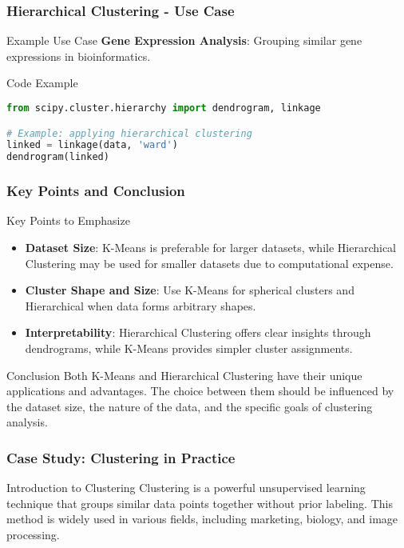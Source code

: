 \documentclass[aspectratio=169]{beamer}
\begin{document}
\begin{frame}[fragile]
    \frametitle{Hierarchical Clustering - Use Case}
    
    \begin{block}{Example Use Case}
        \textbf{Gene Expression Analysis}: Grouping similar gene expressions in bioinformatics.
    \end{block}
    
    \begin{block}{Code Example}
        \begin{lstlisting}[language=Python]
from scipy.cluster.hierarchy import dendrogram, linkage

# Example: applying hierarchical clustering
linked = linkage(data, 'ward')
dendrogram(linked)
        \end{lstlisting}
    \end{block}
\end{frame}

\begin{frame}[fragile]
    \frametitle{Key Points and Conclusion}
    
    \begin{block}{Key Points to Emphasize}
        \begin{itemize}
            \item \textbf{Dataset Size}: K-Means is preferable for larger datasets, while Hierarchical Clustering may be used for smaller datasets due to computational expense.
            \item \textbf{Cluster Shape and Size}: Use K-Means for spherical clusters and Hierarchical when data forms arbitrary shapes.
            \item \textbf{Interpretability}: Hierarchical Clustering offers clear insights through dendrograms, while K-Means provides simpler cluster assignments.
        \end{itemize}
    \end{block}
    
    \begin{block}{Conclusion}
        Both K-Means and Hierarchical Clustering have their unique applications and advantages. The choice between them should be influenced by the dataset size, the nature of the data, and the specific goals of clustering analysis.
    \end{block}
\end{frame}

\begin{frame}
  \frametitle{Case Study: Clustering in Practice}
  
  \begin{block}{Introduction to Clustering}
    Clustering is a powerful unsupervised learning technique that groups similar data points together without prior labeling. 
    This method is widely used in various fields, including marketing, biology, and image processing.
  \end{block}
\end{frame}
\end{document}
